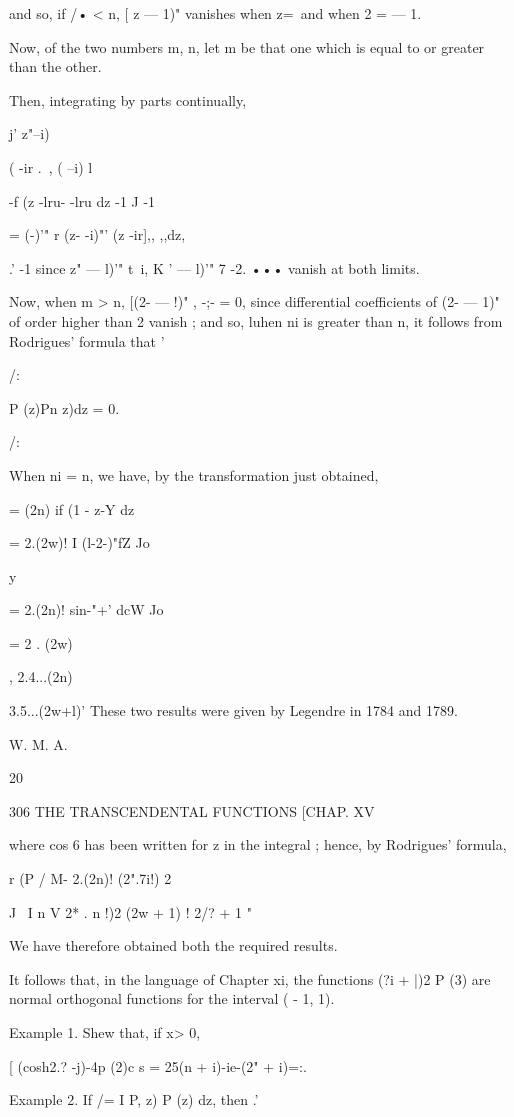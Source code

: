 {and so, if /• < n, [ z — 1)" vanishes when z=\ and when 2 = — 1.

Now, of the two numbers m, n, let m be that one which is equal to or
greater than the other.

Then, integrating by parts continually,

j' z"--i)%

 ( -ir .\ , ( --i) l

-f (z -lru- -lru dz -1 J -1

= (-)'" r (z- -i)"' (z -ir],, ,,dz,

.' -1 since z" — l)'" t\ i, K ' — l)'" 7 -2. ••• vanish at both
limits.

Now, when m > n, [(2- — !)" , -;- = 0, since differential coefficients
of (2- — 1)" of order higher than 2 vanish ; and so, luhen ni is
greater than n, it follows from Rodrigues' formula that '

/:

P (z)Pn z)dz = 0.

/:

When ni = n, we have, by the transformation just obtained,

= (2n) if (1 - z-Y dz

= 2.(2w)! I (l-2-)"fZ Jo

y

= 2.(2n)! sin-"+' dcW Jo

= 2 . (2w)

, 2.4...(2n)

3.5...(2w+l)' These two results were given by Legendre in 1784 and
1789.

W. M. A.

20

306 THE TRANSCENDENTAL FUNCTIONS [CHAP. XV

where cos 6 has been written for z in the integral ; hence, by
Rodrigues' formula,

r (P / M- 2.(2n)! (2".7i!) 2

J \ I n V 2* . n !)2 (2w + 1) ! 2/? + 1 "

We have therefore obtained both the required results.

It follows that, in the language of Chapter xi, the functions (?i +
|)2 P (3) are normal orthogonal functions for the interval ( - 1, 1).

Example 1. Shew that, if x> 0,

[ (cosh2.? -j)-4p (2)c s = 25(n + i)-ie-(2" + i)=:.

Example 2. If /= I P, z) P (z) dz, then .'

}
